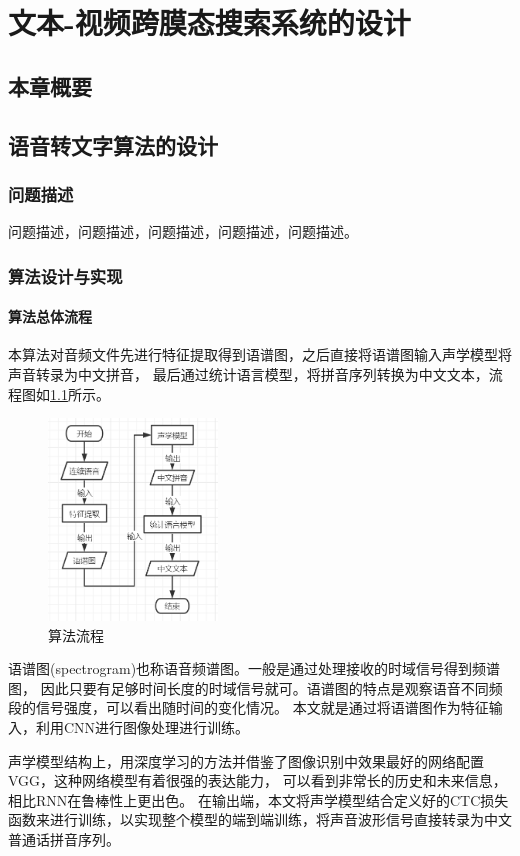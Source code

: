 \documentclass[12pt,a4paper,fancyhdr,openany,oneside]{ctexbook}
\begin{document}
% 
\chapter{文本-视频跨膜态搜索系统的设计}
\section{本章概要}
\section{语音转文字算法的设计}
\subsection{问题描述}
问题描述，问题描述，问题描述，问题描述，问题描述。
\subsection{算法设计与实现}
\subsubsection{算法总体流程} 
本算法对音频文件先进行特征提取得到语谱图，之后直接将语谱图输入声学模型将声音转录为中文拼音，
最后通过统计语言模型，将拼音序列转换为中文文本，流程图如\ref{flowchart}所示。
\begin{figure}[htbp]
    \centering
        \includegraphics[width=0.4\textwidth]{resource/img/flowchart.png}
        \caption{算法流程}
        \label{flowchart}
\end{figure}

语谱图(spectrogram)也称语音频谱图。一般是通过处理接收的时域信号得到频谱图，
因此只要有足够时间长度的时域信号就可。语谱图的特点是观察语音不同频段的信号强度，可以看出随时间的变化情况。
本文就是通过将语谱图作为特征输入，利用CNN进行图像处理进行训练。

声学模型结构上，用深度学习的方法并借鉴了图像识别中效果最好的网络配置VGG，这种网络模型有着很强的表达能力，
可以看到非常长的历史和未来信息，相比RNN在鲁棒性上更出色。
在输出端，本文将声学模型结合定义好的CTC损失函数来进行训练，以实现整个模型的端到端训练，将声音波形信号直接转录为中文
普通话拼音序列。
\end{document}
